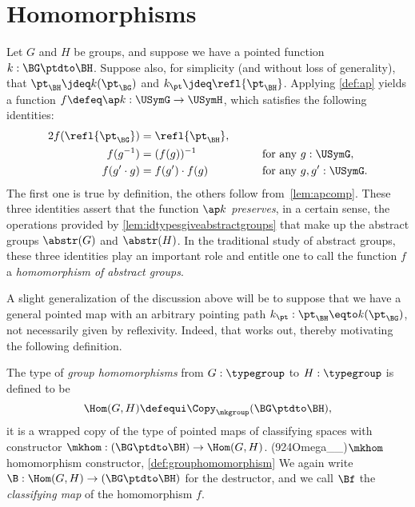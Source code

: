 \section{Homomorphisms}
\label{sec:homomorphisms}

\begin{remark}\label{rem:homom-eqs}
Let $G$ and $H$ be groups, and suppose we have a pointed function $k : \BG \ptdto \BH$.
Suppose also, for simplicity (and without loss of generality),
that $\pt_\BH \jdeq k ( \pt_\BG ) $ and $k_\pt \jdeq \refl{\pt_\BH}$.
Applying \cref{def:ap} yields a function $f \defeq \ap k : \USymG \to \USymH$, which satisfies the following identities:
\begin{alignat*}2
  f ( \refl {\pt_\BG} ) & = \refl{\pt_\BH},  &\qquad&                            \\
  f (g ^ {-1})     & = (f (g))^{-1}         && \text {for any $g : \USymG$},    \\
  f (g' \cdot g)   & =  f (g') \cdot  f (g) && \text {for any $g, g' : \USymG$}.
\end{alignat*}
The first one is true by definition, the others follow from~\cref{lem:apcomp}.
These three identities assert that the function $\ap k$ \emph{preserves}, in a certain sense, the operations provided by \cref{lem:idtypesgiveabstractgroups} that
make up the abstract groups $\abstr(G)$ and $\abstr(H)$.
In the traditional study of abstract groups, these three identities play an important role and entitle one to call the function $f$ a
\emph{homomorphism of abstract groups}.
\end{remark}

A slight generalization of the discussion above will be to suppose that we have a general pointed map with an arbitrary pointing path
$k_\pt : \pt_\BH \eqto k ( \pt_\BG ) $,
not necessarily given by reflexivity.  Indeed, that works out, thereby motivating the following definition.

\begin{definition}\label{def:grouphomomorphism}
  The type of \emph{group homomorphisms}
  from $G:\typegroup$ to
  $H:\typegroup$ is defined to be
  \[
    \Hom(G,H)\defequi\Copy_{\mkgroup}(\BG\ptdto\BH),
  \]
  \ie it is a wrapped copy of the type of pointed maps of classifying spaces
  with constructor
  $\mkhom : (\BG \ptdto \BH) \to \Hom(G,H)$.%
  \glossary(924Omega__){$\protect\mkhom$}{homomorphism constructor, \cref{def:grouphomomorphism}}
  We again write $\B : \Hom(G,H) \to (\BG \ptdto \BH)$ for the destructor,
  and we call $\Bf$ the \emph{classifying map}
  of the homomorphism $f$.
\end{definition}

